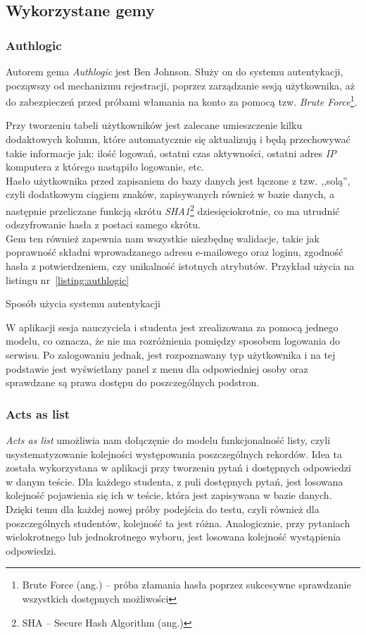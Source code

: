 \documentclass[a4paper,12pt]{article}
\begin{document}
\subsection{Wykorzystane gemy}
\subsubsection{Authlogic}\label{sec:authlogic}
Autorem gema \emph{Authlogic} jest Ben Johnson. Służy on do systemu autentykacji,
począwszy od mechanizmu rejestracji, poprzez zarządzanie sesją użytkownika, aż do
zabezpieczeń przed próbami włamania na konto za pomocą tzw. \emph{Brute
Force}\footnote{Brute Force (ang.) -- próba złamania hasła poprzez sukcesywne sprawdzanie
wszystkich dostępnych możliwości}.


Przy tworzeniu tabeli użytkowników jest zalecane umieszczenie kilku dodaktowych kolumn,
które automatycznie się aktualizują i będą przechowywać takie informacje jak: ilość
logowań, ostatni czas aktywności, ostatni adres \emph{IP} komputera z którego nastąpiło
logowanie, etc.\\
Hasło użytkownika przed zapisaniem do bazy danych jest łączone z tzw. ,,solą'', czyli
dodatkowym ciągiem znaków, zapisywanych również w bazie danych, a następnie przeliczane
funkcją skrótu \emph{SHA1}\footnote{SHA -- Secure Hash Algorithm (ang.)}
dziesięciokrotnie, co ma utrudnić odszyfrowanie hasła z postaci samego skrótu.\\
Gem ten również zapewnia nam wszystkie niezbędnę walidacje, takie jak poprawność składni
wprowadzanego adresu e-mailowego oraz loginu, zgodność hasła z potwierdzeniem, czy
unikalność istotnych atrybutów. Przykład użycia na listingu nr~\ref{listing:authlogic}

\begin{listing}
  
  \caption{Sposób użycia systemu autentykacji}
  \label{listing:authlogic}
\end{listing}


W aplikacji sesja nauczyciela i studenta jest zrealizowana za pomocą jednego modelu, co
oznacza, że nie ma rozróżnienia pomiędzy sposobem logowania do serwisu. Po zalogowaniu
jednak, jest rozpoznawany typ użytkownika i na tej podstawie jest wyświetlany panel z menu
dla odpowiedniej osoby oraz sprawdzane są prawa dostępu do poszczególnych podstron.

\subsubsection{Acts as list}\label{sec:acts_as_list}
\emph{Acts as list} umożliwia nam dołączęnie do modelu funkcjonalność listy, czyli
usystematyzowanie kolejności występowania poszczególnych rekordów. Idea ta została
wykorzystana w aplikacji przy tworzeniu pytań i dostępnych odpowiedzi w danym teście.
Dla każdego studenta, z puli dostępnych pytań, jest losowana kolejność pojawienia się ich w
teście, która jest zapisywana w bazie danych. Dzięki temu dla każdej nowej próby podejścia
do testu, czyli również dla poszczególnych studentów, kolejność ta jest różna.
Analogicznie, przy pytaniach wielokrotnego lub jednokrotnego wyboru, jest losowana
kolejność wystąpienia odpowiedzi.
\end{document}
